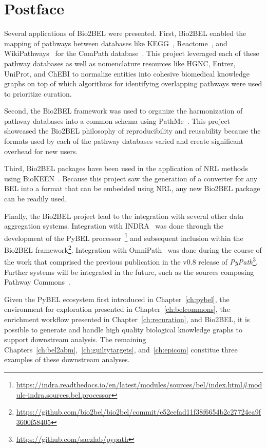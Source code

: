 \section*{Postface}

Several applications of Bio2BEL were presented.
First, Bio2BEL enabled the mapping of pathways between databases like \ac{KEGG}~\cite{Kanehisa2017}, Reactome~\cite{Fabregat2016}, and WikiPathways~\cite{Slenter2018} for the ComPath database~\cite{Domingo-Fernandez2018}.
This project leveraged each of these pathway databases as well as nomenclature resources like HGNC, Entrez, UniProt, and ChEBI to normalize entities into cohesive biomedical knowledge graphs on top of which algorithms for identifying overlapping pathways were used to prioritize curation.

Second, the Bio2BEL framework was used to organize the harmonization of pathway databases into a common schema using PathMe~\cite{Domingo-Fernandez2019a}.
This project showcased the Bio2BEL philosophy of reproducibility and reusability because the formats used by each of the pathway databases varied and create significant overhead for new users.

Third, Bio2BEL packages have been used in the application of \ac{NRL} methods using BioKEEN~\cite{Ali2019}.
Because this project saw the generation of a converter for any \ac{BEL} into a format that can be embedded using \ac{NRL}, any new Bio2BEL package can be readily used.

Finally, the Bio2BEL project lead to the integration with several other data aggregation systems.
Integration with \ac{INDRA}~\cite{Gyori2017} was done through the development of the PyBEL processor~\footnote{\url{https://indra.readthedocs.io/en/latest/modules/sources/bel/index.html\#module-indra.sources.bel.processor}} and subsequent inclusion within the Bio2BEL framework\footnote{\url{https://github.com/bio2bel/bio2bel/commit/e52eefad11f38f6654b2c27724ea9f3600f58405}}.
Integration with OmniPath~\cite{Turei2016} was done during the course of the work that comprised the previous publication in the v0.8 release of \textit{PyPath}\footnote{\url{https://github.com/saezlab/pypath}}.
Further systems will be integrated in the future, such as the sources composing Pathway Commons~\cite{Cerami2011}.

Given the PyBEL ecosystem first introduced in Chapter~\ref{ch:pybel}, the environment for exploration presented in Chapter~\ref{ch:belcommons}, the enrichment workflow presented in Chapter~\ref{ch:recuration}, and Bio2BEL, it is possible to generate and handle high quality biological knowledge graphs to support downstream analysis.
The remaining Chapters~\ref{ch:bel2abm},~\ref{ch:guiltytargets}, and~\ref{ch:epicom} constitue three examples of these downstream analyses.
